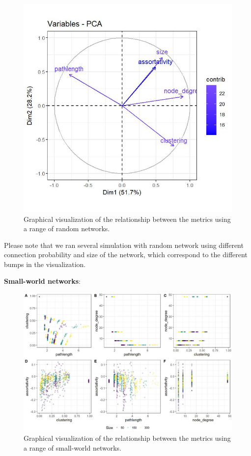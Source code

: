 \documentclass[
]{article}
\begin{document}
\begin{figure}[!H]

{\centering \includegraphics{./Figures/unnamed-chunk-80-1} 

}

\caption{Graphical visualization of the relationship between the metrics using a range of random networks.}\label{fig:unnamed-chunk-80}
\end{figure}

Please note that we ran several simulation with random network using
different connection probability and size of the network, which
correspond to the different bumps in the visualization.

\textbf{Small-world networks}:

\begin{figure}[!H]

{\centering \includegraphics{./Figures/unnamed-chunk-81-1} 

}

\caption{Graphical visualization of the relationship between the metrics using a range of small-world networks.}\label{fig:unnamed-chunk-81}
\end{figure}
\end{document}
